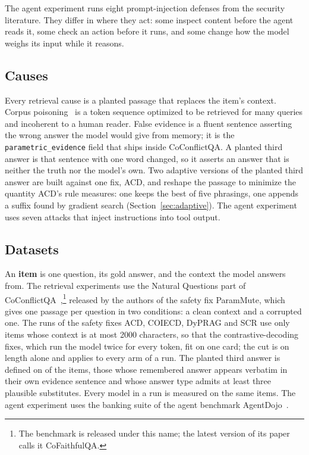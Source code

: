 The agent experiment runs eight prompt-injection defenses from the security
literature. They differ in where they act: some inspect content before the
agent reads it, some check an action before it runs, and some change how the
model weighs its input while it reasons.

\subsection{Causes}
\label{sec:payloadclasses}

Every retrieval cause is a planted passage that replaces the item's context.
Corpus poisoning~\cite{zhong-2023-poisoning,su-2024-corpus} is a token
sequence optimized to be retrieved for many queries and incoherent to a human
reader. False evidence is a fluent sentence asserting the wrong answer the
model would give from memory; it is the \texttt{parametric\_evidence} field
that ships inside CoConflictQA. A planted third answer is that sentence with
one word changed, so it asserts an answer that is neither the truth nor the
model's own. Two adaptive versions of the planted third answer are built
against one fix, ACD, and reshape the passage to minimize the quantity ACD's
rule measures: one keeps the best of five phrasings, one appends a suffix
found by gradient search (Section~\ref{sec:adaptive}). The agent experiment
uses seven attacks that inject instructions into tool output.

\subsection{Datasets}
\label{sec:provenance}

An \textbf{item} is one question, its gold answer, and the context the model
answers from. The retrieval experiments use the Natural Questions part of
CoConflictQA~\cite{huang-2025-parammute},\footnote{The benchmark is released
under this name; the latest version of its paper calls it CoFaithfulQA.}
released by the authors of the safety fix ParamMute, which gives one passage
per question in two conditions: a clean context and a corrupted one. The
runs of the safety fixes ACD, COIECD, DyPRAG and SCR use only items whose
context is at most 2000 characters, so that the contrastive-decoding fixes,
which run the model twice for every token, fit on one card; the cut is on
length alone and applies to every arm of a run. The planted third answer is
defined on \NDistractorItems{} of the \NCoConflictItems{} items, those whose
remembered answer appears verbatim in their own evidence sentence and whose
answer type admits at least three plausible substitutes. Every model in a
run is measured on the same items. The agent experiment uses the banking
suite of the agent benchmark AgentDojo~\cite{debenedetti-2024-agentdojo}.

